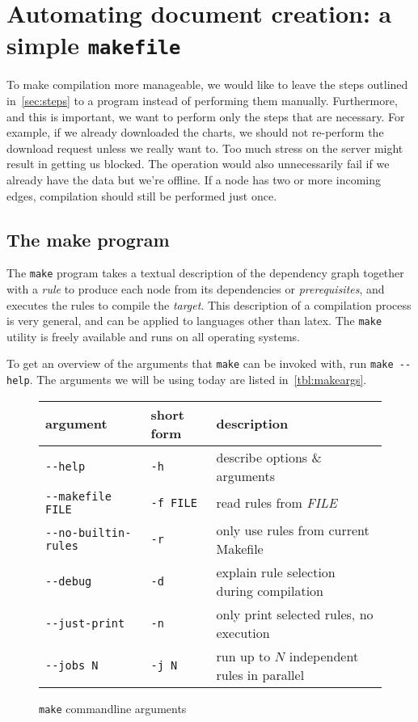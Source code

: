 \documentclass[a4paper,11pt]{article}
\begin{document}
\section[A simple makefile]{Automating document creation: a simple \texttt{makefile}}

To make compilation more manageable, we would like to leave the steps outlined in~\autoref{sec:steps} to a program instead of performing them manually. Furthermore, and this is important, we want to perform only the steps that are necessary. For example, if we already downloaded the charts, we should not re-perform the download request unless we really want to. Too much stress on the server might result in getting us blocked. The operation would also unnecessarily fail if we already have the data but we're offline. If a node has two or more incoming edges, compilation should still be performed just once.

\subsection{The make program}
\label{sec:make-program}

The \texttt{make} program takes a textual description of the dependency graph together with a \emph{rule} to produce each node from its dependencies or \emph{prerequisites}, and executes the rules to compile the \emph{target}. This description of a compilation process is very general, and can be applied to languages other than latex. The \texttt{make} utility is freely available and runs on all operating systems.

To get an overview of the arguments that \texttt{make} can be invoked with, run \verb|make --help|. The arguments we will be using today are listed in~\autoref{tbl:makeargs}.
%
\begin{figure}[h]
  \centering
  \begin{tabular}[h]{l l l}
    argument & short form & description \\ \hline
    \verb|--help| & \verb|-h| & describe options \& arguments \\
    \verb|--makefile FILE| & \verb|-f FILE| & read rules from \emph{FILE} \\
    \verb|--no-builtin-rules| & \verb|-r| & only use rules from current Makefile \\
    \verb|--debug| & \verb|-d| & explain rule selection during compilation \\
    \verb|--just-print| & \verb|-n| & only print selected rules, no  execution \\
    \verb|--jobs N| & \verb|-j N| & run up to $N$ independent rules in parallel
  \end{tabular}
  \caption{\texttt{make} commandline arguments}
  \label{tbl:makeargs}
\end{figure}
%
\end{document}

